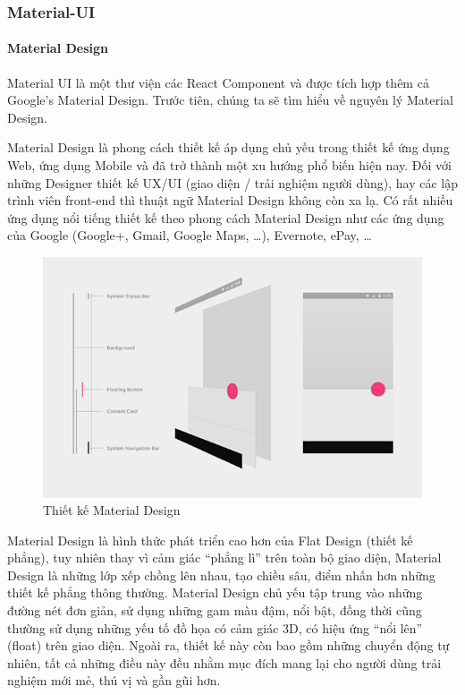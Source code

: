 \subsubsection{Material-UI}
\paragraph{Material Design}
Material UI là một thư viện các React Component và được 
tích hợp thêm cả Google’s Material Design. Trước tiên, 
chúng ta sẽ tìm hiểu về nguyên lý Material Design. 

Material Design là phong cách thiết kế áp dụng chủ yếu trong thiết
kế ứng dụng Web, ứng dụng Mobile và đã trở thành một xu hướng
phổ biến hiện nay. Đối với những Designer thiết kế UX/UI
(giao diện / trải nghiệm người dùng), hay các lập trình viên
front-end thì thuật ngữ Material Design không còn xa lạ.
Có rất nhiều ứng dụng nổi tiếng thiết kế theo phong
cách Material Design như các ứng dụng của Google
(Google+, Gmail, Google Maps, …), Evernote, ePay, …

\begin{figure}[H]
\centering
\includegraphics[width=14cm]{images/material-design.png}
\caption{Thiết kế Material Design}
\end{figure}

Material Design là hình thức phát triển cao hơn của
Flat Design (thiết kế phẳng), tuy nhiên thay vì cảm
giác “phẳng lì” trên toàn bộ giao diện, Material Design là
những lớp xếp chồng lên nhau, tạo chiều sâu, điểm nhấn hơn
những thiết kế phẳng thông thường. Material Design chủ yếu tập
trung vào những đường nét đơn giản, sử dụng những gam màu đậm,
nổi bật, đồng thời cũng thường sử dụng những yếu tố đồ họa
có cảm giác 3D, có hiệu ứng “nổi lên” (float) trên giao diện.
Ngoài ra, thiết kế này còn bao gồm những chuyển động tự nhiên,
tất cả những điều này đều nhằm mục đích mang lại cho người
dùng trải nghiệm mới mẻ, thú vị và gần gũi hơn.


